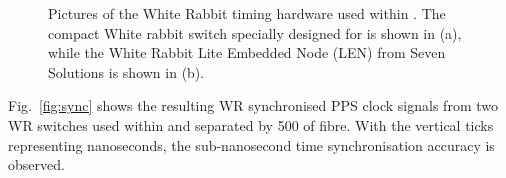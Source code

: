 \begin{figure} %
    \centering
    \quad
    \caption[Pictures of the White Rabbit timing hardware used within \chipsfive.]
    {Pictures of the White Rabbit timing hardware used within \chipsfive. The compact White rabbit
        switch specially designed for \chips is shown in (a), while the White Rabbit Lite Embedded
        Node (LEN) from Seven Solutions is shown in (b).}
    \label{fig:wr_electronics}
\end{figure}

Fig.~\ref{fig:sync} shows the resulting WR synchronised PPS clock signals from two WR switches
used within \chipsfive and separated by \unit{500}{} of fibre. With the vertical ticks
representing nanoseconds, the sub-nanosecond time synchronisation accuracy is observed.

